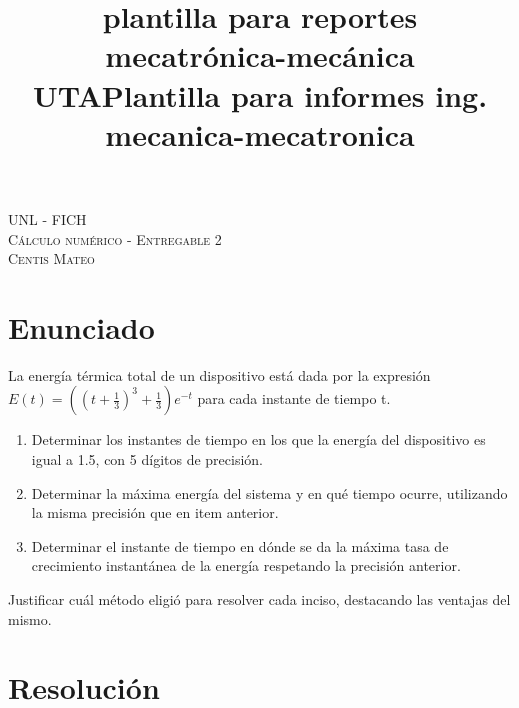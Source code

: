 \documentclass[11pt]{article}
\title{plantilla para reportes mecatrónica-mecánica UTA}
\title{Plantilla para informes ing. mecanica-mecatronica}
\begin{document}

\begin{center}																		%
  \newcommand{\HRule}{\rule{\linewidth}{0.5mm}}									%


  \vspace*{1.0cm}								%
  \textsc{\huge UNL - FICH \vspace{5px}}\\[1.5cm]

  \textsc{\LARGE Cálculo numérico - Entregable 2}\\[1.5cm]													%

  \textsc{\LARGE Centis Mateo}

\end{center}

\section*{Enunciado}
La energía térmica total de un dispositivo está dada por la expresión
$E(t)=((t+\frac{1}{3})^3+\frac{1}{3})e^{-t}$ para cada instante de tiempo t.
\begin{enumerate}
  \renewcommand{\theenumi}{\alph{enumi}} %
  \item Determinar los instantes de tiempo en los que la energía del dispositivo
        es igual a 1.5, con 5 dígitos de precisión.
  \item Determinar la máxima energía del sistema y en qué tiempo ocurre, utilizando
        la misma precisión que en item anterior.
  \item Determinar el instante de tiempo en dónde se da la máxima tasa de crecimiento
        instantánea de la energía respetando la precisión anterior.
\end{enumerate}
Justificar cuál método eligió para resolver cada inciso, destacando las ventajas del mismo.
\newpage
\section*{Resolución}
\end{document}
